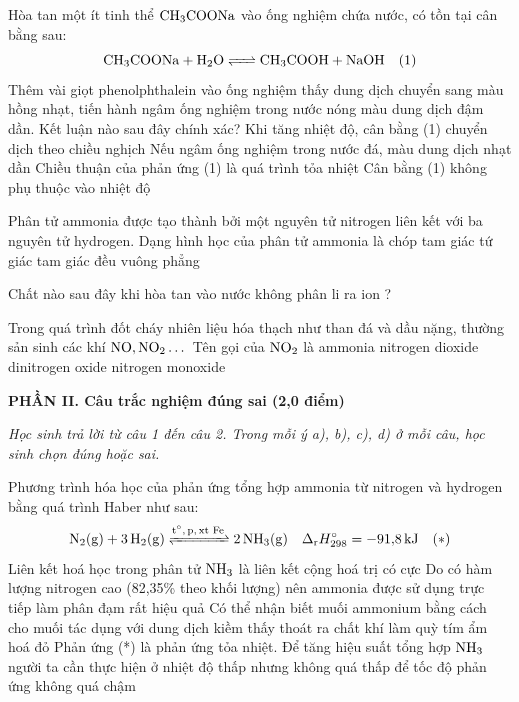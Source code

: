 \documentclass[11pt,a4paper]{article}
\begin{document}
\begin{ex}%
Hòa tan một ít tinh thể $\ce{CH3COONa}$ vào ống nghiệm chứa nước, có tồn tại cân bằng sau:
$$\ce{CH3COONa + H2O <=> CH3COOH + NaOH}\quad (1)$$
Thêm vài giọt phenolphthalein vào ống nghiệm thấy dung dịch chuyển sang màu hồng nhạt, tiến hành ngâm ống nghiệm trong nước nóng màu dung dịch đậm dần. Kết luận nào sau đây chính xác?
\choice
{Khi tăng nhiệt độ, cân bằng (1) chuyển dịch theo chiều nghịch}
{\True Nếu ngâm ống nghiệm trong nước đá, màu dung dịch nhạt dần}
{Chiều thuận của phản ứng (1) là quá trình tỏa nhiệt}
{Cân bằng (1) không phụ thuộc vào nhiệt độ}

\end{ex}


\begin{ex}%
Phân tử ammonia được tạo thành bởi một nguyên tử nitrogen liên kết với ba nguyên tử hydrogen. Dạng hình học của phân tử ammonia là
\choice
{\True chóp tam giác}
{tứ giác}
{tam giác đều}
{vuông phẳng}

\end{ex}


\begin{ex}%
Chất nào sau đây khi hòa tan vào nước không phân li ra ion ?
\choice
{}
{\True {}}
{}
{}

\end{ex}


\begin{ex}%
Trong quá trình đốt cháy nhiên liệu hóa thạch như than đá và dầu nặng, thường sản sinh các khí $\ce{NO, NO2}\dots$ Tên gọi của $\ce{NO2}$ là
\choice
{ammonia}
{\True nitrogen dioxide}
{dinitrogen oxide}
{nitrogen monoxide}

\end{ex}


\vspace{6pt}
\noindent
\textbf{\large\color{mainGreen}PHẦN II. Câu trắc nghiệm đúng sai (2,0 điểm)}

\textit{Học sinh trả lời từ câu 1 đến câu 2. Trong mỗi ý a), b), c), d) ở mỗi câu, học sinh chọn đúng hoặc sai.}
\vspace{4pt}


\begin{ex}%
Phương trình hóa học của phản ứng tổng hợp ammonia từ nitrogen và hydrogen bằng quá trình Haber như sau:
$$\ce{N2(g) + 3H2(g) <=>[t^\circ, p, \text{xt Fe}] 2NH3(g)}\quad \Delta_\text{r}H^\circ_{298} = -91{,}8\,\text{kJ}\quad (*)$$
\choiceTF
{\True Liên kết hoá học trong phân tử $\ce{NH3}$ là liên kết cộng hoá trị có cực}
{Do có hàm lượng nitrogen cao (82,35\% theo khối lượng) nên ammonia được sử dụng trực tiếp làm phân đạm rất hiệu quả}
{Có thể nhận biết muối ammonium bằng cách cho muối tác dụng với dung dịch kiềm thấy thoát ra chất khí làm quỳ tím ẩm hoá đỏ}
{\True Phản ứng (*) là phản ứng tỏa nhiệt. Để tăng hiệu suất tổng hợp $\ce{NH3}$ người ta cần thực hiện ở nhiệt độ thấp nhưng không quá thấp để tốc độ phản ứng không quá chậm}

\end{ex}
\end{document}
